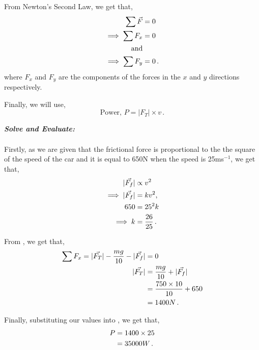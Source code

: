 \begin{subquestions}
From Newton's Second Law, we get that,
\begin{align}
	\sum \vec{F} & = 0 \nonumber \\
	\implies \sum F_x & = 0 \label{2009:q5:FxEqn1} \\
	\text{and} & \nonumber \\
	\implies \sum F_y & = 0 \,.
\end{align}
where $F_x$ and $F_y$ are the components of the forces in the $x$ and $y$ directions respectively.

Finally, we will use,
\begin{equation}
	\text{Power, }P = |F_T|\times v \label{2009:q5:PEqn1} \,.
\end{equation}




\textbf{\textit{Solve and Evaluate:}} \\ \\
Firstly, as we are given that the frictional force is proportional to the the square of the speed of the car and it is equal to 650N when the speed is 25ms$^{-1}$, we get that,
\begin{align}
	|\vec{F_f}| & \propto v^2 \nonumber \\
	\implies |\vec{F_f}| & = kv^2, \nonumber \\
	650 & = 25^2k \nonumber \\
	\implies k & = \frac{26}{25} \,.
\end{align}

From , we get that,
\begin{align}
	\sum F_x = |\vec{F_T}|-\frac{mg}{10}-|\vec{F_f}| & = 0 \nonumber \\
	|\vec{F_T}| & = \frac{mg}{10}+|\vec{F_f}| \nonumber \\
	            & = \frac{750\times10}{10} +650 \nonumber \\
	            & = 1400N \,. \label{2009:q5:TracEqn1}
\end{align} 

Finally, substituting our values into , we get that,
\begin{align}
	P & = 1400 \times 25 \nonumber \\
	  & = 35000W \,.
\end{align}


\subquestion
	

\end{subquestions}
